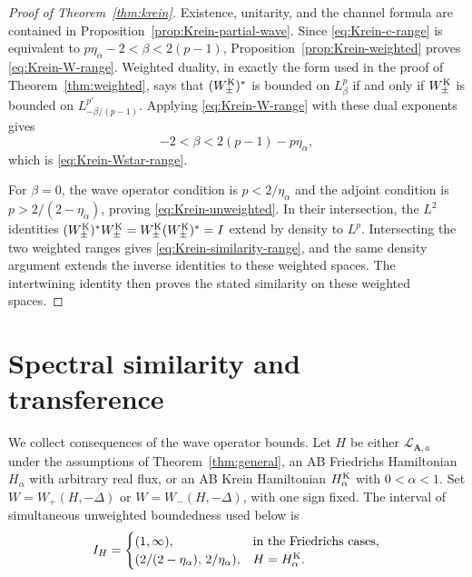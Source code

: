 \documentclass[11pt,a4paper,reqno,backref=page]{amsart}
\numberwithin{equation}{section}
\theoremstyle{definition}
\theoremstyle{remark}
\begin{document}
\begin{proof}[Proof of Theorem~\ref{thm:krein}]
Existence, unitarity, and the channel formula are contained in
Proposition~\ref{prop:Krein-partial-wave}. Since
\eqref{eq:Krein-c-range} is equivalent to
$p\eta_\alpha-2<\beta<2(p-1)$,
Proposition~\ref{prop:Krein-weighted} proves
\eqref{eq:Krein-W-range}. Weighted duality, in exactly the form
used in the proof of Theorem~\ref{thm:weighted}, says that
$(W_\pm^{\rm K})^*$ is bounded on $L^p_\beta$ if and only if
$W_\pm^{\rm K}$ is bounded on $L^{p'}_{-\beta/(p-1)}$. Applying
\eqref{eq:Krein-W-range} with these dual exponents gives
\begin{equation*}
  -2<\beta<2(p-1)-p\eta_\alpha,
\end{equation*}
which is \eqref{eq:Krein-Wstar-range}.

For $\beta=0$, the wave operator condition is $p<2/\eta_\alpha$
and the adjoint condition is $p>2/(2-\eta_\alpha)$, proving
\eqref{eq:Krein-unweighted}. In their intersection, the $L^2$
identities $(W_\pm^{\rm K})^*W_\pm^{\rm K}=W_\pm^{\rm
K}(W_\pm^{\rm K})^*=I$ extend by density to $L^p$. Intersecting
the two weighted ranges gives \eqref{eq:Krein-similarity-range},
and the same density argument extends the inverse identities to
  these weighted spaces. The intertwining identity then proves
  the stated similarity on these weighted spaces.
\end{proof}


\section{Spectral similarity and transference}
\label{sec:applications}


We collect consequences of the wave operator bounds.
Let $H$ be either $\mathcal L_{\mathbf A,a}$ under the
assumptions of Theorem~\ref{thm:general}, an AB Friedrichs
Hamiltonian $H_\alpha$ with arbitrary real flux, or an AB
Krein Hamiltonian $H_\alpha^{\rm K}$ with $0<\alpha<1$.
Set $W=W_+(H,-\Delta)$ or $W=W_-(H,-\Delta)$, with one sign
fixed. The interval of simultaneous unweighted boundedness
used below is
\begin{equation*}
  I_H=
  \begin{cases}
    (1,\infty),&\text{in the Friedrichs cases},\\
    (2/(2-\eta_\alpha),\,2/\eta_\alpha),
      &H=H_\alpha^{\rm K}.
  \end{cases}
\end{equation*}
\end{document}
